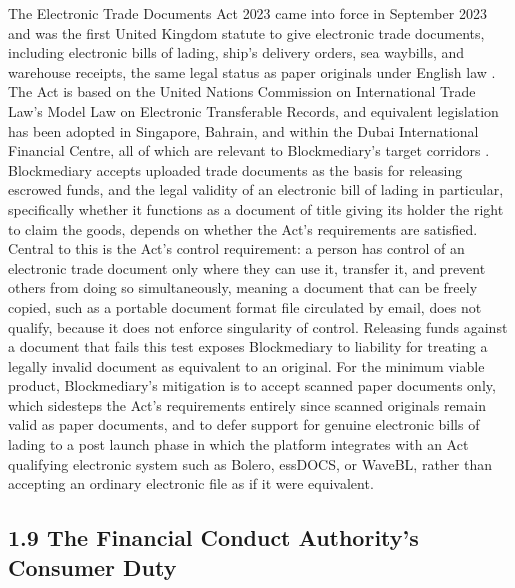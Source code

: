 \documentclass[12pt, a4paper]{article}
\begin{document}
The Electronic Trade Documents Act 2023 came into force in September 2023 and was the
first United Kingdom statute to give electronic trade documents, including electronic
bills of lading, ship's delivery orders, sea waybills, and warehouse receipts, the same
legal status as paper originals under English law \citep{etda2023}. The Act is based on
the United Nations Commission on International Trade Law's Model Law on Electronic
Transferable Records, and equivalent legislation has been adopted in Singapore, Bahrain,
and within the Dubai International Financial Centre, all of which are relevant to
Blockmediary's target corridors \citep{uncitralmletr}. Blockmediary accepts uploaded trade
documents as the basis for releasing escrowed funds, and the legal validity of an
electronic bill of lading in particular, specifically whether it functions as a document
of title giving its holder the right to claim the goods, depends on whether the Act's
requirements are satisfied. Central to this is the Act's control requirement: a person has
control of an electronic trade document only where they can use it, transfer it, and
prevent others from doing so simultaneously, meaning a document that can be freely copied,
such as a portable document format file circulated by email, does not qualify, because it
does not enforce singularity of control. Releasing funds against a document that fails
this test exposes Blockmediary to liability for treating a legally invalid document as
equivalent to an original. For the minimum viable product, Blockmediary's mitigation is to
accept scanned paper documents only, which sidesteps the Act's requirements entirely since
scanned originals remain valid as paper documents, and to defer support for genuine
electronic bills of lading to a post launch phase in which the platform integrates with an
Act qualifying electronic system such as Bolero, essDOCS, or WaveBL, rather than accepting
an ordinary electronic file as if it were equivalent.

\subsection*{1.9 The Financial Conduct Authority's Consumer Duty}
\end{document}
